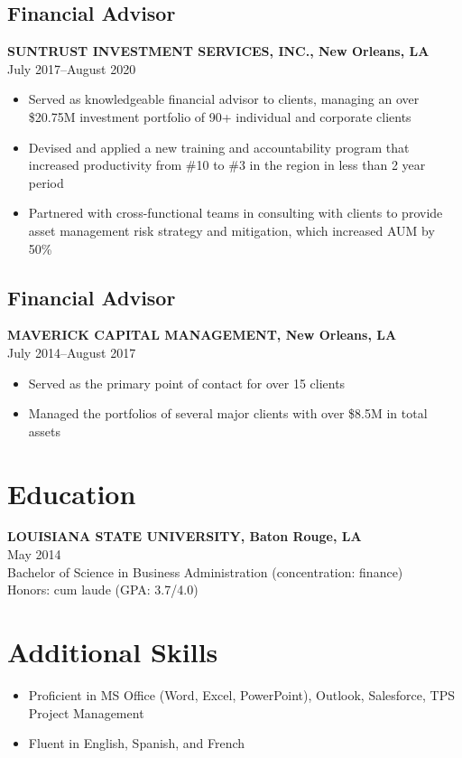 \documentclass[11pt,a4paper]{article}
\newcommand{\resumeItem}[1]{\item #1}
\begin{document}
\subsection{Financial Advisor}
\vspace{-0.5em}
\textbf{SUNTRUST INVESTMENT SERVICES, INC., New Orleans, LA}\\
July 2017--August 2020
\vspace{-0.5em}
\begin{itemize}
    \resumeItem{Served as knowledgeable financial advisor to clients, managing an over \$20.75M investment portfolio of 90+ individual and corporate clients}
    \resumeItem{Devised and applied a new training and accountability program that increased productivity from \#10 to \#3 in the region in less than 2 year period}
    \resumeItem{Partnered with cross-functional teams in consulting with clients to provide asset management risk strategy and mitigation, which increased AUM by 50\%}
\end{itemize}

\subsection{Financial Advisor}
\vspace{-0.5em}
\textbf{MAVERICK CAPITAL MANAGEMENT, New Orleans, LA}\\
July 2014--August 2017
\vspace{-0.5em}
\begin{itemize}
    \resumeItem{Served as the primary point of contact for over 15 clients}
    \resumeItem{Managed the portfolios of several major clients with over \$8.5M in total assets}
\end{itemize}

\section{Education}
\textbf{LOUISIANA STATE UNIVERSITY, Baton Rouge, LA}\\
May 2014\\
Bachelor of Science in Business Administration (concentration: finance)\\ 
Honors: cum laude (GPA: 3.7/4.0)

\section{Additional Skills}
\begin{itemize}
    \resumeItem{Proficient in MS Office (Word, Excel, PowerPoint), Outlook, Salesforce, TPS Project Management}
    \resumeItem{Fluent in English, Spanish, and French}
\end{itemize}
\end{document}
